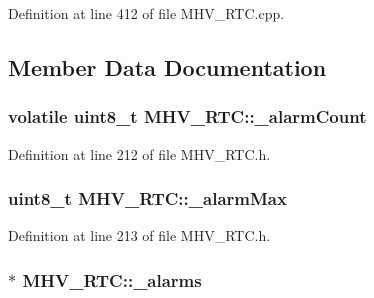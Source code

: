 \-Definition at line 412 of file \-M\-H\-V\-\_\-\-R\-T\-C.\-cpp.



\subsection{\-Member \-Data \-Documentation}
\hypertarget{class_m_h_v___r_t_c_a953a79952c9fa5fde5d1dacbc03d3b46}{
\subsubsection[{\-\_\-alarm\-Count}]{\setlength{\rightskip}{0pt plus 5cm}volatile uint8\-\_\-t {\bf \-M\-H\-V\-\_\-\-R\-T\-C\-::\-\_\-alarm\-Count}}}
\label{class_m_h_v___r_t_c_a953a79952c9fa5fde5d1dacbc03d3b46}


\-Definition at line 212 of file \-M\-H\-V\-\_\-\-R\-T\-C.\-h.

\hypertarget{class_m_h_v___r_t_c_aed7d37466a99362b78dd9ccf1390d35c}{
\subsubsection[{\-\_\-alarm\-Max}]{\setlength{\rightskip}{0pt plus 5cm}uint8\-\_\-t {\bf \-M\-H\-V\-\_\-\-R\-T\-C\-::\-\_\-alarm\-Max}}}
\label{class_m_h_v___r_t_c_aed7d37466a99362b78dd9ccf1390d35c}


\-Definition at line 213 of file \-M\-H\-V\-\_\-\-R\-T\-C.\-h.

\hypertarget{class_m_h_v___r_t_c_afaaed6deea21b52f8bde5f8ebc0abf70}{
\subsubsection[{\-\_\-alarms}]{$\ast$ {\bf \-M\-H\-V\-\_\-\-R\-T\-C\-::\-\_\-alarms}}}
\label{class_m_h_v___r_t_c_afaaed6deea21b52f8bde5f8ebc0abf70}


